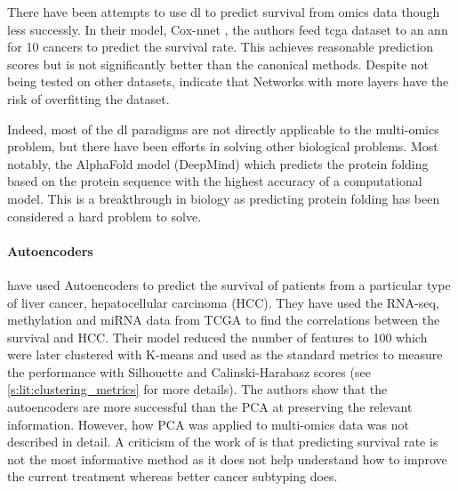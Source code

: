 There have been attempts to use \acrshort{dl} to predict survival from omics data though less successly. In their model, Cox-nnet \cite{Ching2018-gq}, the authors feed \acrshort{tcga} dataset to an \acrshort{ann} for 10 cancers to predict the survival rate. This achieves reasonable prediction scores but is not significantly better than the canonical methods. Despite not being tested on other datasets, \citet{Ching2018-gq} indicate that Networks with more layers have the risk of overfitting the dataset.  

Indeed, most of the \acrshort{dl} paradigms are not directly applicable to the multi-omics problem, but there have been efforts in solving other biological problems. Most notably, the AlphaFold model\cite{Jumper2021-du} (DeepMind) which predicts the protein folding based on the protein sequence with the highest accuracy of a computational model. This is a breakthrough in biology as predicting protein folding has been considered a hard problem to solve.



\paragraph*{Autoencoders} \label{s:lit:autoencoders}

\citet{Chaudhary2018-qj} have used Autoencoders to predict the survival of patients from a particular type of liver cancer, hepatocellular carcinoma (HCC). They have used the RNA-seq, methylation and miRNA data from TCGA to find the correlations between the survival and HCC. Their model reduced the number of features to 100 which were later clustered with K-means and used as the standard metrics to measure the performance with Silhouette and Calinski-Harabasz scores (see \cref{s:lit:clustering_metrics} for more details). The authors show that the autoencoders are  more successful than the PCA at preserving the relevant information. However, how PCA was applied to multi-omics data was not described in detail. A criticism of the work of \citet{Chaudhary2018-qj} is that predicting survival rate is not the most informative method as it does not help understand how to improve the current treatment whereas better cancer subtyping does.

